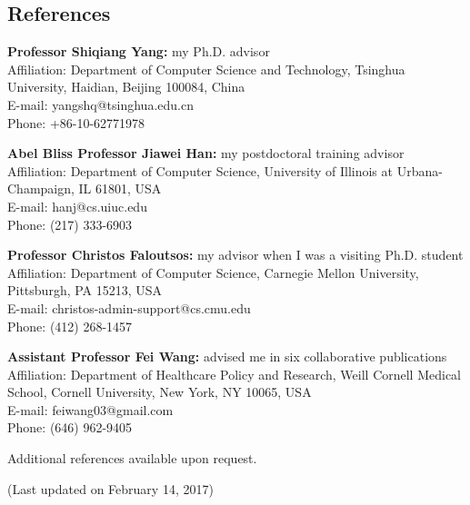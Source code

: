 \documentclass[margin, 10pt]{res}
\begin{document}
\begin{resume}

\section{References}

\textbf{Professor Shiqiang Yang:} my Ph.D. advisor \\
{Affiliation}: {Department of Computer Science and Technology, Tsinghua University, Haidian, Beijing 100084, China} \\
{E-mail:} {yangshq@tsinghua.edu.cn} \\
{Phone:} {+86-10-62771978}

\textbf{Abel Bliss Professor Jiawei Han:} my postdoctoral training advisor \\
{Affiliation}: {Department of Computer Science, University of Illinois at Urbana-Champaign, IL 61801, USA} \\
{E-mail:} {hanj@cs.uiuc.edu} \\
{Phone:} {(217) 333-6903}

\textbf{Professor Christos Faloutsos:} my advisor when I was a visiting Ph.D. student \\
{Affiliation}: {Department of Computer Science, Carnegie Mellon University, Pittsburgh, PA 15213, USA} \\
{E-mail:} {christos-admin-support@cs.cmu.edu} \\
{Phone:} {(412) 268-1457}

\textbf{Assistant Professor Fei Wang:} advised me in six collaborative publications \\
{Affiliation}: {Department of Healthcare Policy and Research, Weill Cornell Medical School, Cornell University, New York, NY 10065, USA} \\
{E-mail:} {feiwang03@gmail.com} \\
{Phone:} {(646) 962-9405}

Additional references available upon request.

(Last updated on February 14, 2017)
\end{resume}
\end{document}
